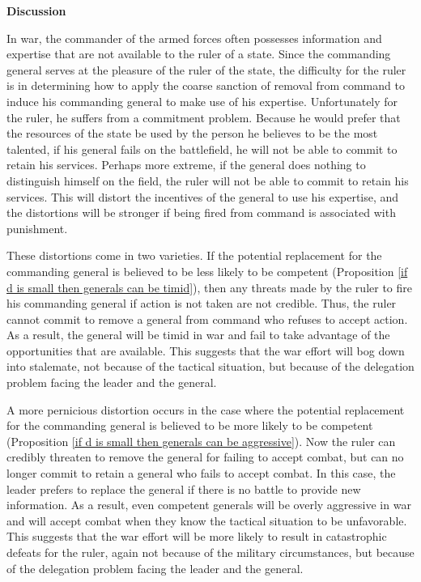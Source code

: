 \documentclass[11pt,]{article}
\begin{document}
\begin{center}
\textbf{\Large{Discussion}}\normalsize\\
\end{center}In war, the commander of the armed forces often possesses information and expertise that are not available to the ruler of a state.  Since the commanding general serves at the pleasure of the ruler of the state, the difficulty for the ruler is in determining how to apply the coarse sanction of removal from command to induce his commanding general to make use of his expertise.  Unfortunately for the ruler, he suffers from a commitment problem.  Because he would prefer that the resources of the state be used by the person he believes to be the most talented, if his general fails on the battlefield, he will not be able to commit to retain his services.  Perhaps more extreme, if the general does nothing to distinguish himself on the field, the ruler will not be able to commit to retain his services.  This will distort the incentives of the general to use his expertise, and the distortions will be stronger if being fired from command is associated with punishment.  

These distortions come in two varieties.  If the potential replacement for the commanding general is believed to be less likely to be competent (Proposition \ref{if d is small then generals can be timid}), then any threats made by the ruler to fire his commanding general if action is not taken are not credible. Thus, the ruler cannot commit to remove a general from command who refuses to accept action. As a result, the general will be timid in war and fail to take advantage of the opportunities that are available.  This suggests that the war effort will bog down into stalemate, not because of the tactical situation, but because of the delegation problem facing the leader and the general.

A more pernicious distortion occurs in the case where the potential replacement for the commanding general is believed to be more likely to be competent (Proposition \ref{if d is small then generals can be aggressive}). Now the ruler can credibly threaten  to remove the general for failing to accept combat, but can no longer commit to retain a general who fails to accept combat. In this case, the leader prefers to replace the general if there is no battle to provide new information.  As a result, even competent generals will be overly aggressive in war and will accept combat when they know the tactical situation to be unfavorable.  This suggests that the war effort will be more likely to result in catastrophic defeats for the ruler, again not because of the military circumstances, but because of the delegation problem facing the leader and the general.
\end{document}
